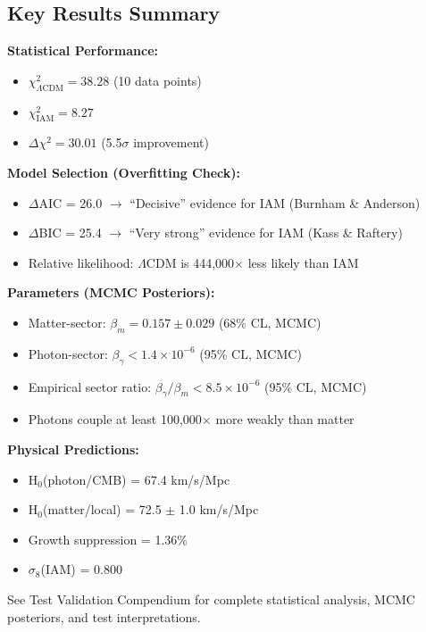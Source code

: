 \documentclass[11pt]{article}
\begin{document}
\subsection{Key Results Summary}

\textbf{Statistical Performance:}
\begin{itemize}
    \item $\chi^2_{\Lambda\text{CDM}} = 38.28$ (10 data points)
    \item $\chi^2_{\text{IAM}} = 8.27$
    \item $\Delta\chi^2 = 30.01$ (5.5$\sigma$ improvement)
\end{itemize}

\textbf{Model Selection (Overfitting Check):}
\begin{itemize}
    \item $\Delta$AIC = 26.0 $\rightarrow$ ``Decisive'' evidence for IAM (Burnham \& Anderson)
    \item $\Delta$BIC = 25.4 $\rightarrow$ ``Very strong'' evidence for IAM (Kass \& Raftery)
    \item Relative likelihood: $\Lambda$CDM is 444,000$\times$ less likely than IAM
\end{itemize}

\textbf{Parameters (MCMC Posteriors):}
\begin{itemize}
    \item Matter-sector: $\beta_m = 0.157 \pm 0.029$ (68\% CL, MCMC)
    \item Photon-sector: $\beta_\gamma < 1.4 \times 10^{-6}$ (95\% CL, MCMC)
    \item Empirical sector ratio: $\beta_\gamma/\beta_m < 8.5 \times 10^{-6}$ (95\% CL, MCMC)
    \item Photons couple at least 100,000$\times$ more weakly than matter
\end{itemize}

\textbf{Physical Predictions:}
\begin{itemize}
    \item H$_0$(photon/CMB) = 67.4 km/s/Mpc
    \item H$_0$(matter/local) = 72.5 $\pm$ 1.0 km/s/Mpc
    \item Growth suppression = 1.36\%
    \item $\sigma_8$(IAM) = 0.800
\end{itemize}

\noindent See Test Validation Compendium for complete statistical analysis, MCMC posteriors, and test interpretations.
\end{document}
